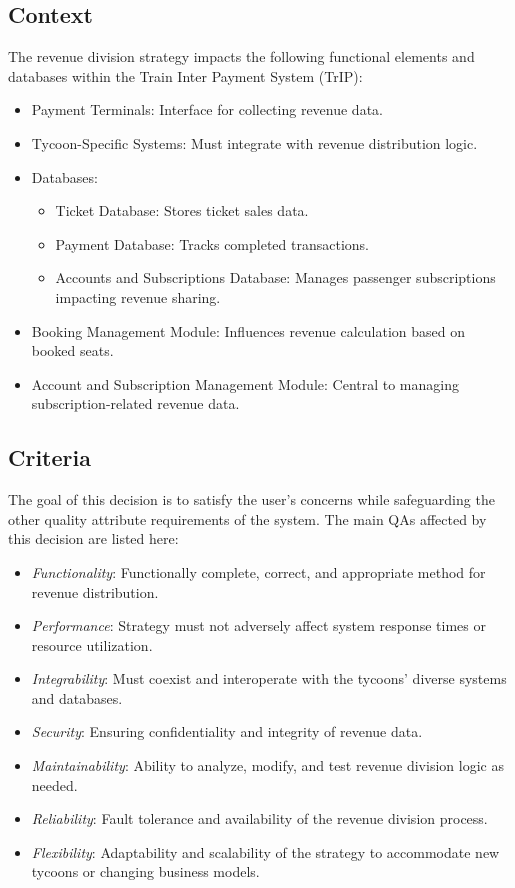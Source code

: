 \subsection*{Context}
The revenue division strategy impacts the following functional elements and databases within the Train Inter Payment System (TrIP):
\begin{itemize}
    \item Payment Terminals: Interface for collecting revenue data.
    \item Tycoon-Specific Systems: Must integrate with revenue distribution logic.
    \item Databases:
    \begin{itemize}
        \item Ticket Database: Stores ticket sales data.
        \item Payment Database: Tracks completed transactions.
        \item Accounts and Subscriptions Database: Manages passenger subscriptions impacting revenue sharing.
    \end{itemize}
    \item Booking Management Module: Influences revenue calculation based on booked seats.
    \item Account and Subscription Management Module: Central to managing subscription-related revenue data.
\end{itemize}

\subsection*{Criteria}
The goal of this decision is to satisfy the user's concerns while safeguarding the other quality attribute requirements of the system. The main QAs affected by this decision are listed here:
\begin{itemize}[noitemsep]
    \item \textit{Functionality}: Functionally complete, correct, and appropriate method for revenue distribution.
    \item \textit{Performance}: Strategy must not adversely affect system response times or resource utilization.
    \item \textit{Integrability}: Must coexist and interoperate with the tycoons' diverse systems and databases.
    \item \textit{Security}: Ensuring confidentiality and integrity of revenue data.
    \item \textit{Maintainability}: Ability to analyze, modify, and test revenue division logic as needed.
    \item \textit{Reliability}: Fault tolerance and availability of the revenue division process.
    \item \textit{Flexibility}: Adaptability and scalability of the strategy to accommodate new tycoons or changing business models.
\end{itemize}

